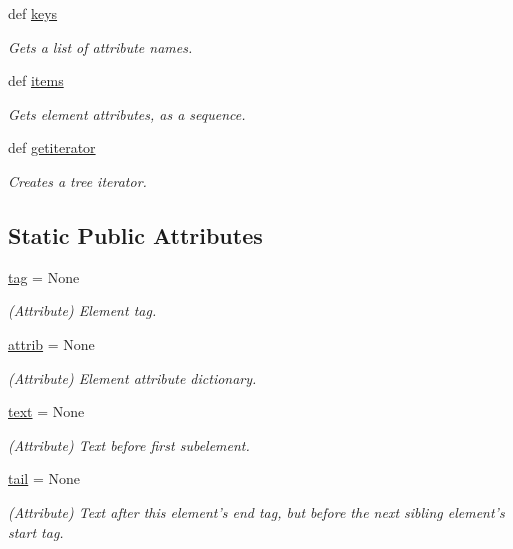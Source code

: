 \begin{DoxyCompactItemize}
def \hyperlink{classPyQt-x11-gpl-4_811_82_1_1elementtree_1_1ElementTree_1_1__ElementInterface_a62c3cf37da26e397a965dbc6a2c28aab}{keys}
\begin{DoxyCompactList}\small\item\em Gets a list of attribute names. \end{DoxyCompactList}\item 
def \hyperlink{classPyQt-x11-gpl-4_811_82_1_1elementtree_1_1ElementTree_1_1__ElementInterface_aaeb4e94165ea44cebec07d5a3f61196c}{items}
\begin{DoxyCompactList}\small\item\em Gets element attributes, as a sequence. \end{DoxyCompactList}\item 
def \hyperlink{classPyQt-x11-gpl-4_811_82_1_1elementtree_1_1ElementTree_1_1__ElementInterface_aed26dc62baffbd9daaac2781592bf81f}{getiterator}
\begin{DoxyCompactList}\small\item\em Creates a tree iterator. \end{DoxyCompactList}\end{DoxyCompactItemize}
\subsection*{Static Public Attributes}
\begin{DoxyCompactItemize}
\item 
\hyperlink{classPyQt-x11-gpl-4_811_82_1_1elementtree_1_1ElementTree_1_1__ElementInterface_a58f5ef5e7535a8ebf5a0c8037d773759}{tag} = None
\begin{DoxyCompactList}\small\item\em (Attribute) Element tag. \end{DoxyCompactList}\item 
\hyperlink{classPyQt-x11-gpl-4_811_82_1_1elementtree_1_1ElementTree_1_1__ElementInterface_a6c2d134d12783c0b1224c7d56b9ee7ca}{attrib} = None
\begin{DoxyCompactList}\small\item\em (Attribute) Element attribute dictionary. \end{DoxyCompactList}\item 
\hyperlink{classPyQt-x11-gpl-4_811_82_1_1elementtree_1_1ElementTree_1_1__ElementInterface_ae7b8e2334e0aeb55cc77ba20c4a0f329}{text} = None
\begin{DoxyCompactList}\small\item\em (Attribute) Text before first subelement. \end{DoxyCompactList}\item 
\hyperlink{classPyQt-x11-gpl-4_811_82_1_1elementtree_1_1ElementTree_1_1__ElementInterface_a4b21c817f69f1ac09402c88eef377f09}{tail} = None
\begin{DoxyCompactList}\small\item\em (Attribute) Text after this element's end tag, but before the next sibling element's start tag. \end{DoxyCompactList}\end{DoxyCompactItemize}


